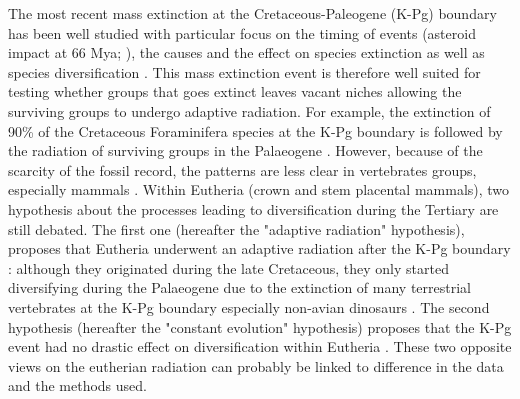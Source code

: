 \documentclass[12pt,letterpaper]{article}
\begin{document}
The most recent mass extinction at the Cretaceous-Paleogene (K-Pg) boundary has been well studied with particular focus on the timing of events (asteroid impact at 66 Mya; \citealt{rennetime2013}), the causes \citep[e.g.][]{rennetime2013,BRV:BRV12128} and the effect on species extinction \citep[e.g.][]{Erwin1998344,BRV:BRV12128} as well as species diversification \citep[e.g.][]{Stadler12042011,meredithimpacts2011,O'Leary08022013}. This mass extinction event is therefore well suited for testing whether groups that goes extinct leaves vacant niches allowing the surviving groups to undergo adaptive radiation. For example, the extinction of 90\% of the Cretaceous Foraminifera species at the K-Pg boundary is followed by the radiation of surviving groups in the Palaeogene \citep{D'Hondt01011996,Coxall01042006}. However, because of the scarcity of the fossil record, the patterns are less clear in vertebrates groups, especially mammals \citep[e.g.][]{meredithimpacts2011,O'Leary08022013}. Within Eutheria (crown and stem placental mammals), two hypothesis about the processes leading to diversification during the Tertiary are still debated. The first one (hereafter the "adaptive radiation" hypothesis), proposes that Eutheria underwent an adaptive radiation after the K-Pg boundary \citep{goswamia2011,MEE3:MEE312084,O'Leary08022013}: although they originated during the late Cretaceous, they only started diversifying during the Palaeogene due to the extinction of many terrestrial vertebrates at the K-Pg boundary especially non-avian dinosaurs \citep{BRV:BRV12128}. The second hypothesis (hereafter the "constant evolution" hypothesis) proposes that the K-Pg event had no drastic effect on diversification within Eutheria \citep{meredithimpacts2011,Stadler12042011,beckancient2014}. These two opposite views on the eutherian radiation can probably be linked to difference in the data and the methods used.
\end{document}
